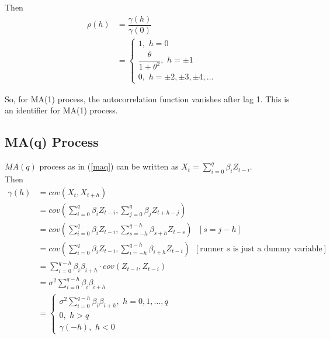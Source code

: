 \documentclass[11pt, a4paper]{article}
\begin{document}
Then
\begin{align*}
\rho(h) &= \dfrac{\gamma(h)}{\gamma(0)} \\[0.35em]
&= \begin{cases}
1, \,\, h = 0 \\[0.25em]
\dfrac{\theta}{1 + \theta^2}, \,\, h = \pm 1 \\[0.5em]
0, \,\, h = \pm 2, \pm 3, \pm 4, \ldots
\end{cases}
\end{align*}

\smallpencil \hspace{0.1cm} So, for MA(1) process, the autocorrelation function vanishes after lag 1. This is an identifier for MA(1) process.

\subsection{MA(q) Process}

$MA(q)$ process as in (\ref{maq}) can be written as $X_t = \sum \limits_{i = 0}^{q} \beta_i Z_{t-i}$. \\

Then
\begin{align*}
\gamma(h) &= cov(X_t, X_{t+h}) \\[0.25em]
&= cov \left(\sum \limits_{i = 0}^{q} \beta_i Z_{t-i}, \sum \limits_{j = 0}^{q} \beta_j Z_{t+h-j} \right) \\[0.25em]
&= cov \left(\sum \limits_{i = 0}^{q} \beta_i Z_{t-i}, \sum \limits_{s = -h}^{q-h} \beta_{s+h} Z_{t-s} \right) \,\,\,\, [s = j-h] \\[0.25em]
&= cov \left(\sum \limits_{i = 0}^{q} \beta_i Z_{t-i}, \sum \limits_{i = -h}^{q-h} \beta_{i+h} Z_{t-i} \right) \,\,\, [\text{runner } s \text{ is just a dummy variable}]\\[0.25em]
&= \sum \limits_{i = 0}^{q - h} \beta_{i}\beta_{i+h} \cdot cov(Z_{t-i}, Z_{t-i}) \\[0.25em]
&= \sigma^2 \sum \limits_{i = 0}^{q - h} \beta_{i}\beta_{i+h} \\[0.25em]
&= \begin{cases}
\sigma^2 \sum \limits_{i = 0}^{q - h} \beta_{i}\beta_{i+h}, \,\, h = 0, 1, \ldots, q \\[0.25em]
0, \,\, h > q \\[0.5em]
\gamma(-h), \,\, h < 0
\end{cases}
\end{align*}

\vspace{0.25cm}
\end{document}
